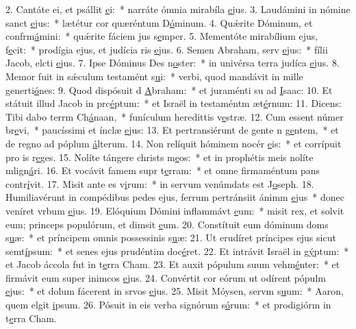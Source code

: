 2. Cantáte ei, et psállit \uline{e}i:~* narráte ómnia mirabíla \uline{e}jus.
3. Laudámini in nómine sanct \uline{e}jus:~* lætétur cor quæréntum D\uline{ó}minum.
4. Quǽrite Dóminum, et confrm\uline{á}mini:~* quǽrite fáciem jus s\uline{e}mper.
5. Mementóte mirabílium ejus,  f\uline{e}cit:~* prodígia ejus, et judícia ris \uline{e}jus.
6. Semen Abraham, serv \uline{e}jus:~* fílii Jacob, elcti \uline{e}jus.
7. Ipse Dóminus Des n\uline{o}ster:~* in univérsa terra judíca \uline{e}jus.
8. Memor fuit in sǽculum testamént s\uline{u}i:~* verbi, quod mandávit in mille generti\uline{ó}nes:
9. Quod dispósuit d \uline{A}braham:~* et juraménti su ad \uline{I}saac:
10. Et státuit illud Jacob in prc\uline{é}ptum:~* et Israël in testaméntm æt\uline{é}rnum:
11. Dicens: Tibi dabo terrm Ch\uline{á}naan,~* funículum heredittis v\uline{e}stræ.
12. Cum essent númer br\uline{e}vi,~* paucíssimi et ínclæ \uline{e}jus:
13. Et pertransiérunt de gente n g\uline{e}ntem,~* et de regno ad póplum \uline{á}lterum.
14. Non relíquit hóminem nocér \uline{e}is:~* et corrípuit pro is r\uline{e}ges.
15. Nolíte tángere christs m\uline{e}os:~* et in prophétis meis nolíte mlign\uline{á}ri.
16. Et vocávit famem supr t\uline{e}rram:~* et omne firmaméntum pans contr\uline{í}vit.
17. Misit ante es v\uline{i}rum:~* in servum venúmdats est J\uline{o}seph.
18. Humiliavérunt in compédibus pedes ejus, ferrum pertránsiit ánimm \uline{e}jus~* donec veníret vrbum \uline{e}jus.
19. Elóquium Dómini inflammávt \uline{e}um:~* misit rex, et solvit eum; princeps populórum, et dimsit \uline{e}um.
20. Constítuit eum dóminum doms s\uline{u}æ:~* et príncipem omnis possessinis s\uline{u}æ:
21. Ut erudíret príncipes ejus sicut semt\uline{í}psum:~* et senes ejus prudéntim doc\uline{é}ret.
22. Et intrávit Israël in g\uline{ý}ptum:~* et Jacob áccola fut in t\uline{e}rra Cham.
23. Et auxit pópulum suum vehm\uline{é}nter:~* et firmávit eum super inimcos \uline{e}jus.
24. Convértit cor eórum ut odírent pópulm \uline{e}jus:~* et dolum fácerent in srvos \uline{e}jus.
25. Misit Móysen, servm s\uline{u}um:~* Aaron, quem elgit \uline{i}psum.
26. Pósuit in eis verba signórum s\uline{ó}rum:~* et prodigiórm in t\uline{e}rra Cham.
